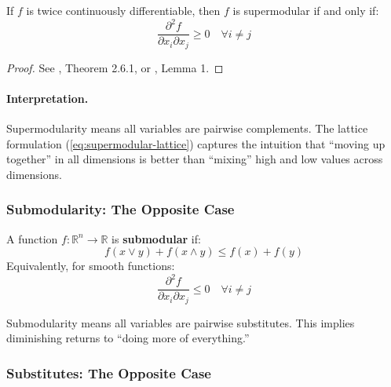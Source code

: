 \begin{theorem}
\label{thm:supermod-crosspartial}
If $f$ is twice continuously differentiable, then $f$ is supermodular if 
and only if:
\begin{equation}
    \frac{\partial^2 f}{\partial x_i \partial x_j} \geq 0 \quad \forall i \neq j
    \label{eq:supermod-condition}
\end{equation}
\end{theorem}

\begin{proof}
See \citet{topkis1978}, Theorem 2.6.1, or \citet{milgromroberts1990compare}, 
Lemma 1.
\end{proof}

\paragraph{Interpretation.}
Supermodularity means all variables are pairwise complements. The lattice 
formulation (\ref{eq:supermodular-lattice}) captures the intuition that 
``moving up together'' in all dimensions is better than ``mixing'' high 
and low values across dimensions.

\subsubsection{Submodularity: The Opposite Case}

\begin{definition}[Submodularity]
\label{def:submodularity}
A function $f: \mathbb{R}^n \to \mathbb{R}$ is \textbf{submodular} if:
\begin{equation}
    f(x \vee y) + f(x \wedge y) \leq f(x) + f(y)
    \label{eq:submodular-lattice}
\end{equation}
Equivalently, for smooth functions:
\begin{equation}
    \frac{\partial^2 f}{\partial x_i \partial x_j} \leq 0 \quad \forall i \neq j
    \label{eq:submod-condition}
\end{equation}
\end{definition}

Submodularity means all variables are pairwise substitutes. This implies
diminishing returns to ``doing more of everything.''

\subsubsection{Substitutes: The Opposite Case}

